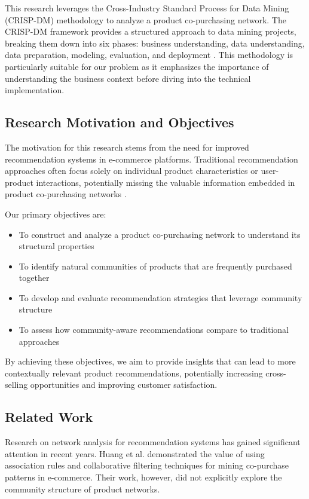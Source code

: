 \documentclass[conference]{IEEEtran}
\begin{document}
This research leverages the Cross-Industry Standard Process for Data Mining (CRISP-DM) methodology to analyze a product co-purchasing network. The CRISP-DM framework provides a structured approach to data mining projects, breaking them down into six phases: business understanding, data understanding, data preparation, modeling, evaluation, and deployment \cite{shearer2000crisp}. This methodology is particularly suitable for our problem as it emphasizes the importance of understanding the business context before diving into the technical implementation.

\subsection{Research Motivation and Objectives}
The motivation for this research stems from the need for improved recommendation systems in e-commerce platforms. Traditional recommendation approaches often focus solely on individual product characteristics or user-product interactions, potentially missing the valuable information embedded in product co-purchasing networks \cite{sarwar2001item}.

Our primary objectives are:
\begin{itemize}
    \item To construct and analyze a product co-purchasing network to understand its structural properties
    \item To identify natural communities of products that are frequently purchased together
    \item To develop and evaluate recommendation strategies that leverage community structure
    \item To assess how community-aware recommendations compare to traditional approaches
\end{itemize}

By achieving these objectives, we aim to provide insights that can lead to more contextually relevant product recommendations, potentially increasing cross-selling opportunities and improving customer satisfaction.

\subsection{Related Work}
Research on network analysis for recommendation systems has gained significant attention in recent years. Huang et al. \cite{huang2007applying} demonstrated the value of using association rules and collaborative filtering techniques for mining co-purchase patterns in e-commerce. Their work, however, did not explicitly explore the community structure of product networks.
\end{document}
